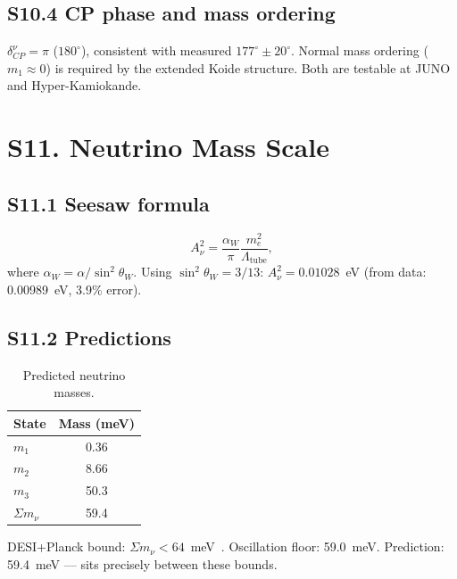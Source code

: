 \documentclass[11pt,a4paper]{article}
\begin{document}
\subsection{S10.4 CP phase and mass ordering}

$\delta_{CP}^\nu = \pi$ ($180^\circ$), consistent with measured $177^\circ \pm 20^\circ$. Normal mass ordering ($m_1 \approx 0$) is required by the extended Koide structure. Both are testable at JUNO~\cite{juno2016} and Hyper-Kamiokande.

\section{S11. Neutrino Mass Scale}
\label{sec:S11}

\subsection{S11.1 Seesaw formula}

\begin{equation}
  A_\nu^2 = \frac{\alpha_W}{\pi}\frac{m_e^2}{\Lambda_{\text{tube}}},
\end{equation}
where $\alpha_W = \alpha/\sin^2\theta_W$. Using $\sin^2\theta_W = 3/13$: $A_\nu^2 = 0.01028$~eV (from data: 0.00989~eV, 3.9\% error).

\subsection{S11.2 Predictions}

\begin{table}[h]
\centering
\begin{tabular}{@{}lc@{}}
\toprule
State & Mass (meV) \\
\midrule
$m_1$ & 0.36 \\
$m_2$ & 8.66 \\
$m_3$ & 50.3 \\
$\Sigma m_\nu$ & 59.4 \\
\bottomrule
\end{tabular}
\caption{Predicted neutrino masses.}
\label{tab:neutrino-masses}
\end{table}

DESI+Planck bound: $\Sigma m_\nu < 64$~meV~\cite{desi2024}. Oscillation floor: 59.0~meV. Prediction: 59.4~meV --- sits precisely between these bounds.

\end{document}
